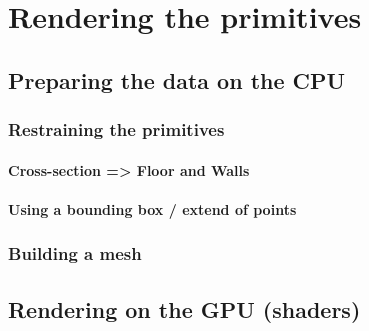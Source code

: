 \section{Rendering the primitives}

\subsection{Preparing the data on the CPU}

\subsubsection{Restraining the primitives}

\paragraph{Cross-section => Floor and Walls}

\paragraph{Using a bounding box / extend of points}

\subsubsection{Building a mesh}

\subsection{Rendering on the GPU (shaders)}
